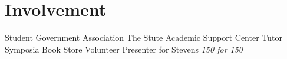 \documentclass[a4paper, 11pt]{article}
\begin{document}
\begin{minipage}[h]{0.63\textwidth}
\section{Involvement}
\textcolor{location}{
Student Government Association \textbullet{}
The Stute \textbullet{}
Academic Support Center Tutor \textbullet{}
Symposia Book Store Volunteer \textbullet{}
Presenter for Stevens \textit{150 for 150}}
\end{minipage}
\end{document}
